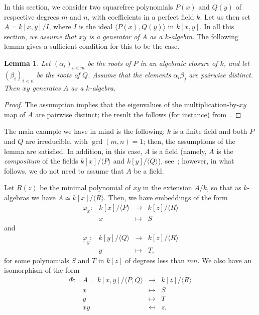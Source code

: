 \documentclass{sig-alternate}
\newcommand{\ang}[1]{\langle#1\rangle}
\newtheorem{Lemma}{Lemma}
\begin{document}
In this section, we consider two squarefree polynomials $P(x)$ and
$Q(y)$ of respective degrees $m$ and $n$, with coefficients in a
perfect field $k$. Let us then set $A=k[x,y]/I$, where $I$ is the
ideal $\ang{P(x),Q(y)}$ in $k[x,y]$. In all this section, {\em we
  assume that $xy$ is a generator of $A$ as a $k$-algebra}. The
following lemma gives a sufficient condition for this to be the case.

\begin{Lemma}
  \label{lemma:compositum}
  Let $(\alpha_i)_{i<m}$ be the roots of $P$ in an algebraic closure
  of $k$, and let $(\beta_i)_{i<n}$ be the roots of $Q$. Assume that
  the elements $\alpha_i\beta_j$ are pairwise distinct. Then $xy$
  generates $A$ as a $k$-algebra.
\end{Lemma}
\begin{proof}
  The assumption implies that the eigenvalues of the
  multiplication-by-$xy$ map of $A$ are pairwise distinct; the result
  the follows (for instance) from~\cite[Prop.~2.2.12]{DiEm05}.
\end{proof}

The main example we have in mind is the following: $k$ is a finite
field and both $P$ and $Q$ are irreducible, with $\gcd(m,n)=1$; then,
the assumptions of the lemma are satisfied. In addition, in this case,
$A$ is a field (namely, $A$ is the {\em compositum} of the fields
$k[x]/\ang{P}$ and $k[y]/\ang{Q}$), see~\cite{BrCa87}; however, in
what follows, we do not need to assume that $A$ be a field.

Let $R(z)$ be the minimal polynomial of $xy$ in the extension $A/k$, so
that as $k$-algebras we have $A \simeq k[x]/\ang{R}$. Then, we have
embeddings of the form
$$\begin{array}{cccc}
\varphi_x: & k[x]/\ang{P} & \to & k[z]/\ang{R}\\
& x & \mapsto & S
\end{array}$$
and
$$\begin{array}{cccc}
\varphi_y: & k[y]/\langle Q \rangle & \to & k[z]/\ang{R}\\
& y & \mapsto & T,
\end{array}$$
for some polynomials $S$ and $T$ in $k[z]$ of degrees less
than $mn$. We also have an isomorphism of the form
$$\begin{array}{cccc} 
\Phi:&  A=k[x,y]/\langle P,Q\rangle & \to & k[z]/\ang{R} \\
&  x & \mapsto & S \\
&  y & \mapsto & T \\
&  xy & \mapsfrom & z.
\end{array}$$
\end{document}
